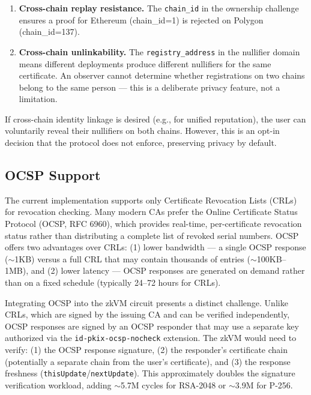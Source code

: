 \documentclass[11pt, a4paper]{article}
\begin{document}
\begin{enumerate}
\def\labelenumi{\arabic{enumi}.}
\item
  \textbf{Cross-chain replay resistance.} The \texttt{chain\_id} in the
  ownership challenge ensures a proof for Ethereum (chain\_id=1) is
  rejected on Polygon (chain\_id=137).
\item
  \textbf{Cross-chain unlinkability.} The \texttt{registry\_address} in
  the nullifier domain means different deployments produce different
  nullifiers for the same certificate. An observer cannot determine
  whether registrations on two chains belong to the same person --- this
  is a deliberate privacy feature, not a limitation.
\end{enumerate}

If cross-chain identity linkage is desired (e.g., for unified
reputation), the user can voluntarily reveal their nullifiers on both
chains. However, this is an opt-in decision that the protocol does not
enforce, preserving privacy by default.

\subsection{OCSP Support}\label{ocsp-support}

The current implementation supports only Certificate Revocation Lists
(CRLs) for revocation checking. Many modern CAs prefer the Online
Certificate Status Protocol (OCSP, RFC 6960), which provides real-time,
per-certificate revocation status rather than distributing a complete
list of revoked serial numbers. OCSP offers two advantages over CRLs:
(1) lower bandwidth --- a single OCSP response ($\sim$1KB)
versus a full CRL that may contain thousands of entries
($\sim$100KB--1MB), and (2) lower latency --- OCSP responses
are generated on demand rather than on a fixed schedule (typically
24--72 hours for CRLs).

Integrating OCSP into the zkVM circuit presents a distinct challenge.
Unlike CRLs, which are signed by the issuing CA and can be verified
independently, OCSP responses are signed by an OCSP responder that may
use a separate key authorized via the \texttt{id-pkix-ocsp-nocheck}
extension. The zkVM would need to verify: (1) the OCSP response
signature, (2) the responder's certificate chain (potentially a separate
chain from the user's certificate), and (3) the response freshness
(\texttt{thisUpdate}/\texttt{nextUpdate}). This approximately doubles
the signature verification workload, adding $\sim$5.7M cycles
for RSA-2048 or $\sim$3.9M for P-256.
\end{document}

